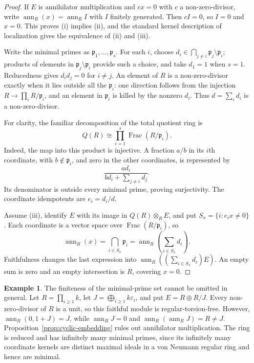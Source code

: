 \documentclass[11pt]{amsart}
\theoremstyle{plain}
\theoremstyle{definition}
\newtheorem{example}[theorem]{Example}
\theoremstyle{remark}
\newcommand{\ann}{\operatorname{ann}}
\numberwithin{equation}{section}
\begin{document}
\begin{proof}
If $E$ is annihilator multiplication and $cx=0$ with $c$ a
non-zero-divisor, write $\ann_R(x)=\ann_R I$ with $I$ finitely
generated. Then $cI=0$, so $I=0$ and $x=0$.
This proves (i) implies (ii), and the standard kernel description of
localization gives the equivalence of (ii) and (iii).

Write the minimal primes as $\mathfrak p_1,\ldots,\mathfrak p_s$.
For each $i$, choose
$d_i\in\bigcap_{j\ne i}\mathfrak p_j\setminus\mathfrak p_i$;
products of elements in $\mathfrak p_j\setminus\mathfrak p_i$
provide such a choice, and take $d_1=1$ when $s=1$.
Reducedness gives $d_id_j=0$ for $i\ne j$.
An element of $R$ is a non-zero-divisor exactly when it lies outside
all the $\mathfrak p_i$: one direction follows from the injection
$R\to\prod_i R/\mathfrak p_i$, and an element in $\mathfrak p_i$
is killed by the nonzero $d_i$.
Thus $d=\sum_i d_i$ is a non-zero-divisor.

For clarity, the familiar decomposition of the total quotient ring is
\[
 Q(R)\cong\prod_{i=1}^s\operatorname{Frac}(R/\mathfrak p_i).
\]
Indeed, the map into this product is injective. A fraction $a/b$ in
its $i$th coordinate, with $b\notin\mathfrak p_i$, and zero in the
other coordinates, is represented by
\[
 \frac{a d_i}{b d_i+\sum_{j\ne i}d_j}.
\]
Its denominator is outside every minimal prime, proving surjectivity.
The coordinate idempotents are $e_i=d_i/d$.

Assume (iii), identify $E$ with its image in $Q(R)\otimes_R E$, and
put $S_x=\{i:e_ix\ne0\}$.
Each coordinate is a vector space over $\operatorname{Frac}(R/\mathfrak p_i)$,
so
\[
 \ann_R(x)=\bigcap_{i\in S_x}\mathfrak p_i
 =\ann_R\left(\sum_{i\in S_x}d_i\right).
\]
Faithfulness changes the last expression into
$\ann_R((\sum_{i\in S_x}d_i)E)$.
An empty sum is zero and an empty intersection is $R$, covering $x=0$.
\end{proof}

\begin{example}\label{ex:infinite-min-obstruction}
The finiteness of the minimal-prime set cannot be omitted in general.
Let $R=\prod_{i\ge1}k$, let $J=\bigoplus_{i\ge1}k\varepsilon_i$,
and put $E=R\oplus R/J$.
Every non-zero-divisor of $R$ is a unit, so this faithful module is
regular-torsion-free. However, $\ann_R(0,1+J)=J$, while
$\ann_R J=0$ and $\ann_R(\ann_R J)=R\ne J$.
Proposition~\ref{prop:cyclic-embedding} rules out annihilator multiplication.
The ring is reduced and has infinitely many minimal primes, since its
infinitely many coordinate kernels are distinct maximal ideals in a
von Neumann regular ring and hence are minimal.
\end{example}
\end{document}
